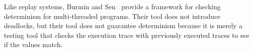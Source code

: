 Like replay systems, Burmin and Sen~\cite{Burnim2009asserting} provide a framework for
checking determinism for multi-threaded programs. Their tool does not
introduce deadlocks, but their tool does not guarantee determinism
because it is merely a testing tool that checks the execution trace
with previously executed traces to see if the values match.





